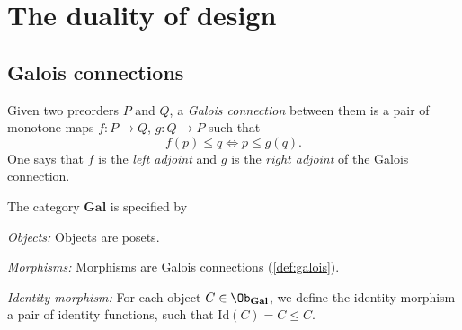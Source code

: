 \section{The duality of design}
\subsection{Galois connections}



\begin{shaded}
\begin{definition}
\label{def:galois}
Given two preorders $P$ and $Q$, a \emph{Galois connection} between them is a pair of monotone maps $f\colon P\to Q$, $g\colon Q\to P$ such that
\begin{equation}
    f(p)\leq q \Leftrightarrow p\leq g(q).
\end{equation}
One says that $f$ is the \emph{left adjoint} and $g$ is the \emph{right adjoint} of the Galois connection.
\end{definition}
\end{shaded}

\begin{definition}
The category $\mathbf{Gal}$ is specified by
\begin{compactenum}
    \item \emph{Objects:} Objects are posets.
    \item \emph{Morphisms:} Morphisms are Galois connections (\cref{def:galois}).
    \item \emph{Identity morphism:} For each object $C\in \Ob_\mathbf{Gal}$, we define the identity morphism a pair of identity functions, such that $\text{Id}(C)=C\leq C$.
\end{compactenum}
\end{definition}